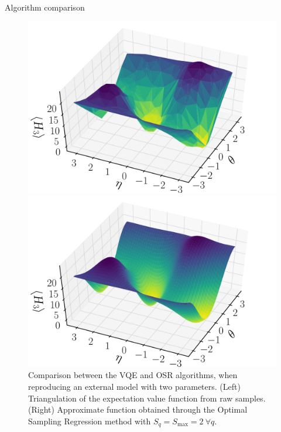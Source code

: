 \documentclass[9pt, aspectratio=169]{beamer}
\begin{document}

\begin{frame}{Algorithm comparison}

\begin{figure}[!tbp]
	\centering
	\begin{minipage}[c]{.40\linewidth}
		\centering
		\includegraphics[width=\linewidth]{Figures/NJL1-model-solving/deuteron-VQE}
	\end{minipage}
	\hspace{.025\linewidth}
	\begin{minipage}[c]{.40\linewidth}
		\centering
		\includegraphics[width=\linewidth]{Figures/NJL1-model-solving/deuteron-OSR}
	\end{minipage}
	\caption{Comparison between the VQE and OSR algorithms, when reproducing an external model with two parameters. (Left) Triangulation of the expectation value function from raw samples. (Right) Approximate function obtained through the Optimal Sampling Regression method with $S_q=S_{\text{max}}=2 ~\forall q$.}
\end{figure}


\end{frame}
\end{document}
